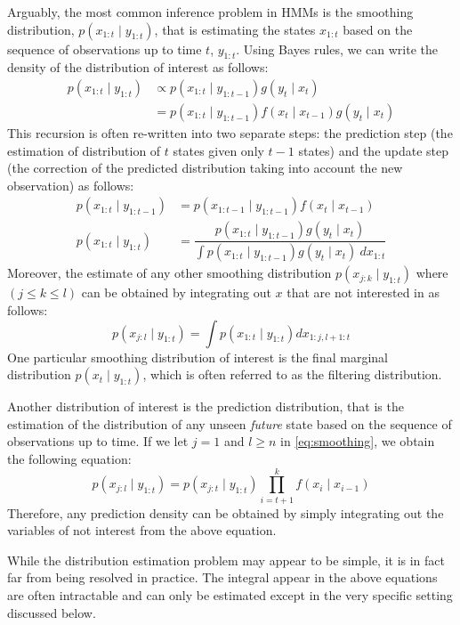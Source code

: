 Arguably, the most common inference problem in HMMs is the smoothing distribution, $p(x_{1:t} \mid y_{1:t})$, that is estimating the states $x_{1:t}$ based on the sequence of observations up to time $t$, $y_{1:t}$. Using Bayes rules, we can write the density of the distribution of interest as follows:
\begin{align}
    p(x_{1:t} \mid y_{1:t}) &\propto p(x_{1:t} \mid y_{1:t-1}) g(y_t \mid x_t) \nonumber \\
                            &= p(x_{1:t} \mid y_{1:t-1})f(x_t \mid x_{t-1})g(y_t \mid x_t)
\end{align}
This recursion is often re-written into two separate steps: the prediction step (the estimation of distribution of $t$ states given only $t-1$ states) and the update step (the correction of the predicted distribution taking into account the new observation) as follows:
\begin{align}
  p(x_{1:t} \mid y_{1:t-1}) &= p(x_{1:t-1} \mid y_{1:t-1})f(x_t \mid x_{t-1}) \nonumber \\
  p(x_{1:t} \mid y_{1:t})   &= \dfrac{p(x_{1:t} \mid y_{1:t-1}) g(y_t \mid x_t)}{\displaystyle\int p(x_{1:t} \mid y_{1:t-1}) g(y_t \mid x_t)~dx_{1:t}}
\end{align}
Moreover, the estimate of any other smoothing distribution $p(x_{j:k} \mid y_{1:t})$ where $(j \leq k \leq l)$ can be obtained by integrating out $x$ that are not interested in as follows:
\begin{equation}
  p(x_{j:l} \mid y_{1:t}) = \int p(x_{1:t} \mid y_{1:t}) dx_{1:j, l+1:t}
\label{eq:smoothing}
\end{equation}
One particular smoothing distribution of interest is the final marginal distribution $p(x_t \mid y_{1:t})$, which is often referred to as the filtering distribution.

Another distribution of interest is  the prediction distribution, that is the estimation of the distribution of any unseen \emph{future} state based on the sequence of observations up to time. If we let $j = 1$ and $l \geq n$ in \eqref{eq:smoothing}, we obtain the following equation:
\begin{equation}
  p(x_{j:l} \mid y_{1:t}) = p(x_{j:t} \mid y_{1:t}) \prod^k_{i=t+1} f(x_i \mid x_{i-1})
\end{equation}
Therefore, any prediction density can be obtained by simply integrating out the variables of not interest from the above equation.

While the distribution estimation problem may appear to be simple, it is in fact far from being resolved in practice. The integral appear in the above equations are often intractable and can only be estimated except in the very specific setting discussed below.

